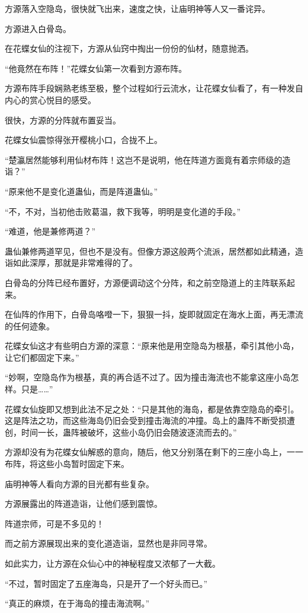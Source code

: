 \begin{this_body}
方源落入空隐岛，很快就飞出来，速度之快，让庙明神等人又一番诧异。

方源进入白骨岛。

在花蝶女仙的注视下，方源从仙窍中掏出一份份的仙材，随意抛洒。

“他竟然在布阵！”花蝶女仙第一次看到方源布阵。

方源布阵手段娴熟老练至极，整个过程如行云流水，让花蝶女仙看了，有一种发自内心的赏心悦目的感受。

很快，方源的分阵就布置妥当。

花蝶女仙震惊得张开樱桃小口，合拢不上。

“楚瀛居然能够利用仙材布阵！这岂不是说明，他在阵道方面竟有着宗师级的造诣？”

“原来他不是变化道蛊仙，而是阵道蛊仙。”

“不，不对，当初他击败葛温，救下我等，明明是变化道的手段。”

“难道，他是兼修两道？”

蛊仙兼修两道罕见，但也不是没有。但像方源这般两个流派，居然都如此精通，造诣如此深厚，那就是非常难得的了。

白骨岛的分阵已经布置好，方源便调动这个分阵，和之前空隐道上的主阵联系起来。

在仙阵的作用下，白骨岛咯噔一下，狠狠一抖，旋即就固定在海水上面，再无漂流的任何迹象。

花蝶女仙这才有些明白方源的深意：“原来他是用空隐岛为根基，牵引其他小岛，让它们都固定下来。”

“妙啊，空隐岛作为根基，真的再合适不过了。因为撞击海流也不能拿这座小岛怎样。只是……”

花蝶女仙旋即又想到此法不足之处：“只是其他的海岛，都是依靠空隐岛的牵引。这是阵法之功，而这些海岛仍旧会受到撞击海流的冲撞。岛上的蛊阵不断受损遭创，时间一长，蛊阵被破坏，这些小岛仍旧会随波逐流而去的。”

方源却没有为花蝶女仙解惑的意向，随后，他又分别落在剩下的三座小岛上，一一布阵，将这些小岛暂时固定下来。

庙明神等人看向方源的目光都有些复杂。

方源展露出的阵道造诣，让他们感到震惊。

阵道宗师，可是不多见的！

而之前方源展现出来的变化道造诣，显然也是非同寻常。

如此实力，让方源在众仙心中的神秘程度又浓郁了一大截。

“不过，暂时固定了五座海岛，只是开了一个好头而已。”

“真正的麻烦，在于海岛的撞击海流啊。”


\end{this_body}
